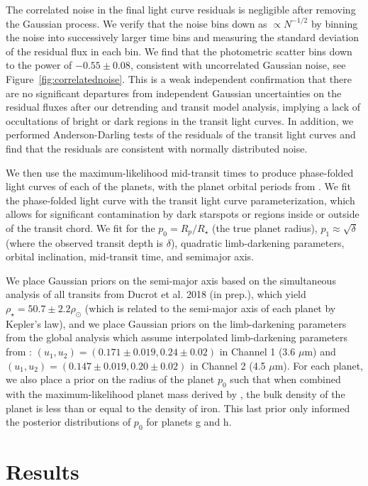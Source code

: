 The correlated noise in the final light curve residuals is negligible after removing the Gaussian process. We verify that the noise bins down as $\propto N^{-1/2}$ by binning the noise into successively larger time bins and measuring the standard deviation of the residual flux in each bin. We find that the photometric scatter bins down to the power of $-0.55 \pm 0.08$, consistent with uncorrelated Gaussian noise, see Figure~\ref{fig:correlatednoise}. This is a weak independent confirmation that there are no significant departures from independent Gaussian uncertainties on the residual fluxes after our detrending and transit model analysis, implying a lack of occultations of bright or dark regions in the \spitzer transit light curves. In addition, we performed Anderson-Darling tests of the residuals of the \spitzer transit light curves and find that the residuals are consistent with normally distributed noise.

We then use the maximum-likelihood mid-transit times to produce phase-folded light curves of each of the planets, with the planet orbital periods from \citet{Delrez2018}. We fit the phase-folded light curve with the \citet{Morris2018f} transit light curve parameterization, which allows for significant contamination by dark starspots or regions inside or outside of the transit chord. We fit for the $p_0 = R_p/R_\star$ (the true planet radius), $p_1 \approx \sqrt{\delta}$ (where the observed transit depth is $\delta$), quadratic limb-darkening parameters, orbital inclination, mid-transit time, and semimajor axis. 

We place Gaussian priors on the semi-major axis based on the simultaneous analysis of all transits from Ducrot et al. 2018 (in prep.), which yield $\rho_\star = 50.7 \pm 2.2 \rho_\odot$ (which is related to the semi-major axis of each planet by Kepler's law), and we place Gaussian priors on the limb-darkening parameters from the global analysis which assume interpolated limb-darkening parameters from \citet{Claret2013}: $(u_1, u_2) = (0.171 \pm 0.019, 0.24 \pm 0.02)$ in \spitzer Channel 1 (3.6 $\mu $m) and $(u_1, u_2) = (0.147 \pm 0.019, 0.20 \pm 0.02)$ in Channel 2 (4.5 $\mu$m). For each planet, we also place a prior on the radius of the planet $p_0$ such that when combined with the maximum-likelihood planet mass derived by \citet{Grimm2018}, the bulk density of the planet is less than or equal to the density of iron. This last prior only informed the posterior distributions of $p_0$ for planets g and h.


\section{Results}



